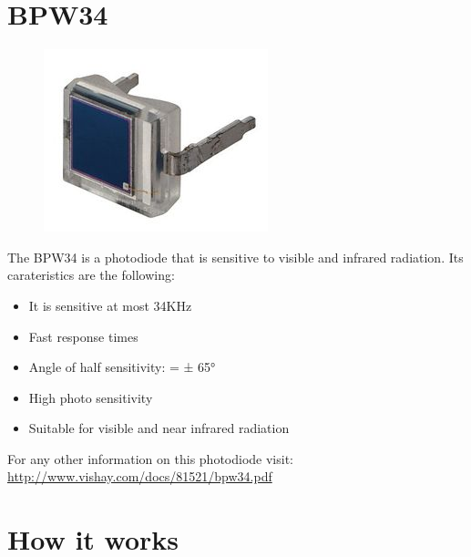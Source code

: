 \documentclass[18pt,oneside,a4paper,titlepage]{article}
\begin{document}
\section{BPW34}
	\begin{figure}[h]
		\centering
		\includegraphics[scale=0.3]{fotodiodo.jpg}
	\end{figure}
	The BPW34 is a photodiode that is sensitive to visible and infrared radiation. Its carateristics are the following:
	\begin{itemize}
		\item It is sensitive at most 34KHz
		\item Fast response times
		\item Angle of half sensitivity: = ± 65°
		\item High photo sensitivity
		\item Suitable for visible and near infrared radiation
	\end{itemize}
	
For any other information on this photodiode visit: \url{http://www.vishay.com/docs/81521/bpw34.pdf}
\newpage
\section{How it works}
\end{document}
